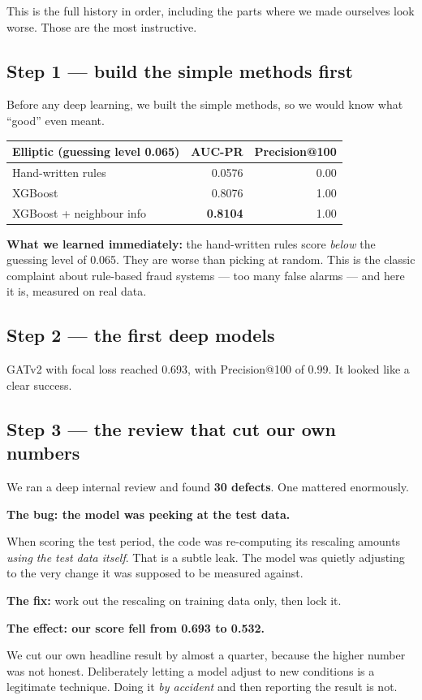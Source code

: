 \documentclass[11pt,a4paper]{article}
\begin{document}
This is the full history in order, including the parts where we made ourselves
look worse. Those are the most instructive.

\subsection{Step 1 --- build the simple methods first}

Before any deep learning, we built the simple methods, so we would know what
``good'' even meant.

\begin{center}\small
\begin{tabular}{@{}lrr@{}}
\toprule
\textbf{Elliptic (guessing level 0.065)} & \textbf{AUC-PR} & \textbf{Precision@100} \\
\midrule
Hand-written rules & 0.0576 & 0.00 \\
XGBoost & 0.8076 & 1.00 \\
XGBoost + neighbour info & \textbf{0.8104} & 1.00 \\
\bottomrule
\end{tabular}
\end{center}

\textbf{What we learned immediately:} the hand-written rules score \emph{below}
the guessing level of 0.065. They are worse than picking at random. This is the
classic complaint about rule-based fraud systems --- too many false alarms --- and
here it is, measured on real data.

\subsection{Step 2 --- the first deep models}

GATv2 with focal loss reached 0.693, with Precision@100 of 0.99. It looked like a
clear success.

\subsection{Step 3 --- the review that cut our own numbers}

We ran a deep internal review and found \textbf{30 defects}. One mattered
enormously.

\begin{warnbox}
\textbf{The bug: the model was peeking at the test data.}

When scoring the test period, the code was re-computing its rescaling amounts
\emph{using the test data itself}. That is a subtle leak. The model was quietly
adjusting to the very change it was supposed to be measured against.

\textbf{The fix:} work out the rescaling on training data only, then lock it.

\textbf{The effect: our score fell from 0.693 to 0.532.}

We cut our own headline result by almost a quarter, because the higher number was
not honest. Deliberately letting a model adjust to new conditions is a legitimate
technique. Doing it \emph{by accident} and then reporting the result is not.
\end{warnbox}
\end{document}
